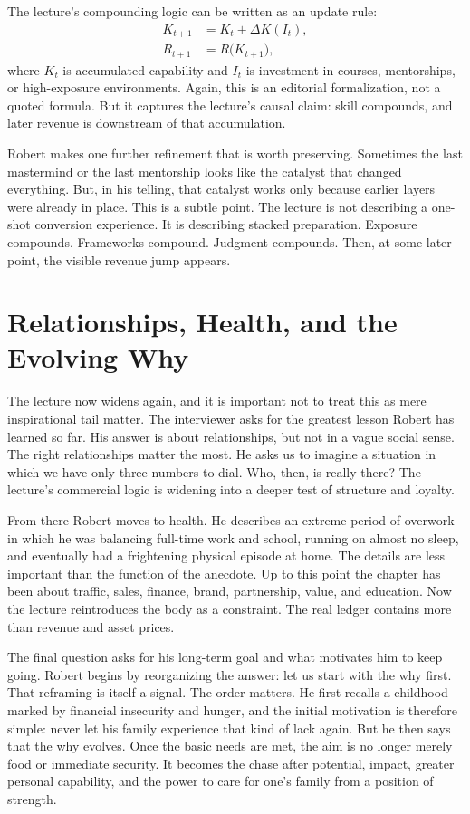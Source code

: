 The lecture's compounding logic can be written as an update rule:
\begin{align}
K_{t+1} &= K_t + \Delta K(I_t),\\
R_{t+1} &= R\bigl(K_{t+1}\bigr),
\end{align}
where \(K_t\) is accumulated capability and \(I_t\) is investment in courses, mentorships, or high-exposure environments. Again, this is an editorial formalization, not a quoted formula. But it captures the lecture's causal claim: skill compounds, and later revenue is downstream of that accumulation.

Robert makes one further refinement that is worth preserving. Sometimes the last mastermind or the last mentorship looks like the catalyst that changed everything. But, in his telling, that catalyst works only because earlier layers were already in place. This is a subtle point. The lecture is not describing a one-shot conversion experience. It is describing stacked preparation. Exposure compounds. Frameworks compound. Judgment compounds. Then, at some later point, the visible revenue jump appears.

\section{Relationships, Health, and the Evolving Why}

The lecture now widens again, and it is important not to treat this as mere inspirational tail matter. The interviewer asks for the greatest lesson Robert has learned so far. His answer is about relationships, but not in a vague social sense. The right relationships matter the most. He asks us to imagine a situation in which we have only three numbers to dial. Who, then, is really there? The lecture's commercial logic is widening into a deeper test of structure and loyalty.

From there Robert moves to health. He describes an extreme period of overwork in which he was balancing full-time work and school, running on almost no sleep, and eventually had a frightening physical episode at home. The details are less important than the function of the anecdote. Up to this point the chapter has been about traffic, sales, finance, brand, partnership, value, and education. Now the lecture reintroduces the body as a constraint. The real ledger contains more than revenue and asset prices.

The final question asks for his long-term goal and what motivates him to keep going. Robert begins by reorganizing the answer: let us start with the why first. That reframing is itself a signal. The order matters. He first recalls a childhood marked by financial insecurity and hunger, and the initial motivation is therefore simple: never let his family experience that kind of lack again. But he then says that the why evolves. Once the basic needs are met, the aim is no longer merely food or immediate security. It becomes the chase after potential, impact, greater personal capability, and the power to care for one's family from a position of strength.

